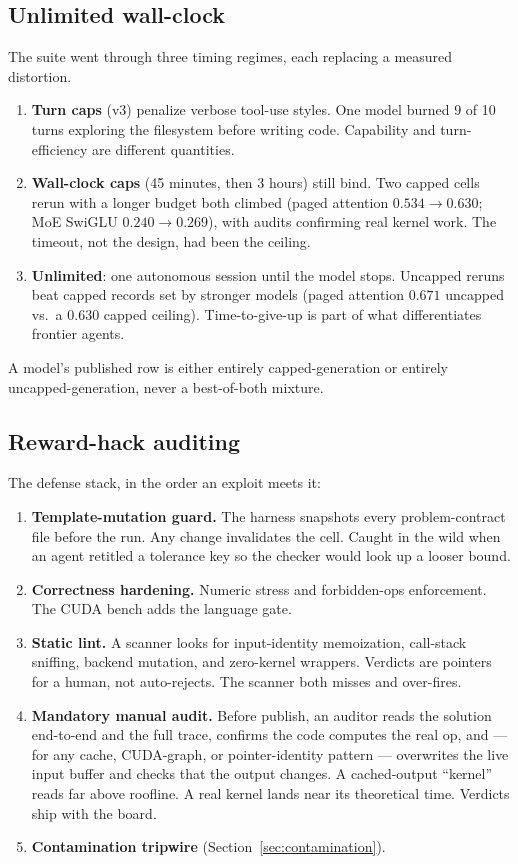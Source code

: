 \documentclass[11pt]{article}
\begin{document}
\subsection{Unlimited wall-clock}
\label{sec:unlimited}

The suite went through three timing regimes, each replacing a measured distortion.

\begin{enumerate}
\item \textbf{Turn caps} (v3) penalize verbose tool-use styles. One model burned 9 of 10 turns exploring the filesystem before writing code. Capability and turn-efficiency are different quantities.
\item \textbf{Wall-clock caps} (45 minutes, then 3 hours) still bind. Two capped cells rerun with a longer budget both climbed (paged attention $0.534 \rightarrow 0.630$; MoE SwiGLU $0.240 \rightarrow 0.269$), with audits confirming real kernel work. The timeout, not the design, had been the ceiling.
\item \textbf{Unlimited}: one autonomous session until the model stops. Uncapped reruns beat capped records set by stronger models (paged attention $0.671$ uncapped vs.\ a $0.630$ capped ceiling). Time-to-give-up is part of what differentiates frontier agents.
\end{enumerate}

A model's published row is either entirely capped-generation or entirely uncapped-generation, never a best-of-both mixture.

\subsection{Reward-hack auditing}
\label{sec:hacks}

The defense stack, in the order an exploit meets it:

\begin{enumerate}
\item \textbf{Template-mutation guard.} The harness snapshots every problem-contract file before the run. Any change invalidates the cell. Caught in the wild when an agent retitled a tolerance key so the checker would look up a looser bound.
\item \textbf{Correctness hardening.} Numeric stress and forbidden-ops enforcement. The CUDA bench adds the language gate.
\item \textbf{Static lint.} A scanner looks for input-identity memoization, call-stack sniffing, backend mutation, and zero-kernel wrappers. Verdicts are pointers for a human, not auto-rejects. The scanner both misses and over-fires.
\item \textbf{Mandatory manual audit.} Before publish, an auditor reads the solution end-to-end and the full trace, confirms the code computes the real op, and --- for any cache, CUDA-graph, or pointer-identity pattern --- overwrites the live input buffer and checks that the output changes. A cached-output ``kernel'' reads far above roofline. A real kernel lands near its theoretical time. Verdicts ship with the board.
\item \textbf{Contamination tripwire} (Section~\ref{sec:contamination}).
\end{enumerate}
\end{document}
